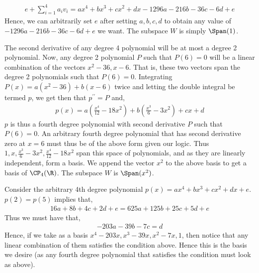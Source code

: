 \documentclass{book}
\begin{document}
\begin{enumerate}[label=\arabic*)]
\begin{enumerate}[label=\arabic*)]
        \begin{align*}
          e + \sum_{i = 1}^{4}a_iv_i = ax^4 + bx^3 + cx^2 + dx - 1296a - 216b - 36c - 6d + e
        \end{align*}
        Hence, we can arbitrarily set $e$ after setting $a, b, c, d$ to obtain any value of $- 1296a - 216b - 36c - 6d + e$ we want. 
      \ii
        The subspace $W$ is simply $\Span(1)$.
    \end{enumerate}
    \ii
    \begin{enumerate}[label=\arabic*)]
      \ii 
        The second derivative of any degree 4 polynomial will be at most a degree 2 polynomial. Now, any degree 2 polynomial $P$ such that $P(6) = 0$ will be a linear
        combination of the vectors $x^2 - 36, x - 6$. That is, these two vectors span the degree 2 polynomials such that $P(6) = 0$. Integrating $P(x) = a(x^2 - 36) + b(x - 6)$
        twice and letting the double integral be termed $p$, we get then that $p^{\prime\prime} = P$ and,
        \begin{align*}
          p(x) = a(\frac{x^4}{12} - 18x^2) + b(\frac{x^3}{6} - 3x^2) + cx + d
        \end{align*}
        $p$ is thus a fourth degree polynomial with second derivative $P$ such that $P(6) = 0$. An arbitrary fourth degree polynomial that has second derivative zero at $x = 6$
        must thus be of the above form given our logic. Thus $1, x, \frac{x^3}{6} - 3x^2, \frac{x^4}{12} - 18x^2$ span this space of polynomials, and as they are linearly
        independent, form a basis.
      \ii
        We append the vector $x^2$ to the above basis to get a basis of $\CP_4(\R)$.
      \ii
        The subspace $W$ is $\Span(x^2)$.
    \end{enumerate}
    \ii
    \begin{enumerate}[label=\arabic*)]
      \ii 
        Consider the arbitrary 4th degree polynomial $p(x) = ax^4 + bx^3 + cx^2 + dx + e$. $p(2) = p(5)$ implies that,
        \begin{align*}
          16a + 8b + 4c + 2d + e = 625a + 125b + 25c + 5d + e
        \end{align*}
        Thus we must have that,
        \begin{align*}
          -203a - 39b - 7c = d
        \end{align*}
        Hence, if we take as a basis $x^4 - 203x, x^3 - 39x, x^2 - 7x, 1$, then notice that any linear combination of them satisfies the condition above. Hence this is the basis
        we desire (as any fourth degree polynomial that satisfies the condition must look as above).

\end{enumerate}
\end{enumerate}
\end{document}
